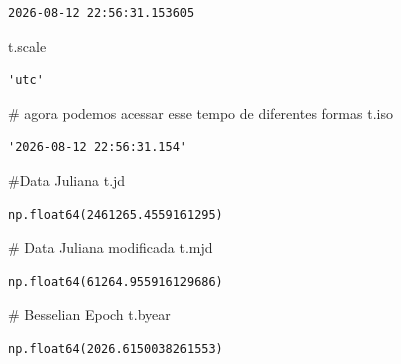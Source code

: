 \documentclass[
  letterpaper,
  DIV=11,
  numbers=noendperiod]{scrreprt}
\newenvironment{Shaded}{\begin{snugshade}}{\end{snugshade}}
\newcommand{\CommentTok}[1]{\textcolor[rgb]{0.37,0.37,0.37}{#1}}
\newcommand{\NormalTok}[1]{\textcolor[rgb]{0.00,0.23,0.31}{#1}}
\begin{document}
\begin{verbatim}
2026-08-12 22:56:31.153605
\end{verbatim}

\begin{Shaded}
\begin{Highlighting}[]
\NormalTok{t.scale}
\end{Highlighting}
\end{Shaded}

\begin{verbatim}
'utc'
\end{verbatim}

\begin{Shaded}
\begin{Highlighting}[]
\CommentTok{\# agora podemos acessar esse tempo de diferentes formas}
\NormalTok{t.iso}
\end{Highlighting}
\end{Shaded}

\begin{verbatim}
'2026-08-12 22:56:31.154'
\end{verbatim}

\begin{Shaded}
\begin{Highlighting}[]
\CommentTok{\#Data Juliana}
\NormalTok{t.jd}
\end{Highlighting}
\end{Shaded}

\begin{verbatim}
np.float64(2461265.4559161295)
\end{verbatim}

\begin{Shaded}
\begin{Highlighting}[]
\CommentTok{\# Data Juliana modificada}
\NormalTok{t.mjd}
\end{Highlighting}
\end{Shaded}

\begin{verbatim}
np.float64(61264.955916129686)
\end{verbatim}

\begin{Shaded}
\begin{Highlighting}[]
\CommentTok{\# Besselian Epoch}
\NormalTok{t.byear}
\end{Highlighting}
\end{Shaded}

\begin{verbatim}
np.float64(2026.6150038261553)
\end{verbatim}
\end{document}
